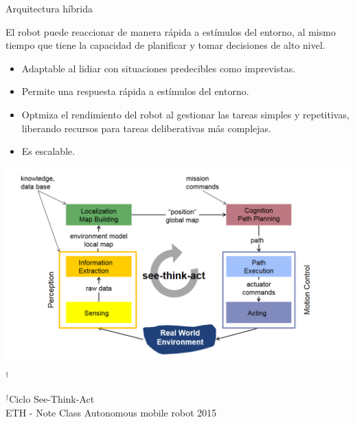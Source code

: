 \documentclass[
  24pt, %
  aspectratio=169, %
]{beamer}
\begin{document}
\begin{frame}{Arquitectura híbrida}
  \begin{minipage}{0.47\textwidth}
    
    \small El robot puede reaccionar de manera rápida a estímulos del entorno, al mismo tiempo que tiene la capacidad de planificar y tomar decisiones de alto nivel.
    
    \begin{itemize}
    \item Adaptable al lidiar con situaciones predecibles como imprevistas.
    \item Permite una respuesta rápida a estímulos del entorno.
    \item Optmiza el rendimiento del robot al gestionar las tareas simples y repetitivas, liberando recursos para tareas deliberativas más complejas.
    \item Es escalable.
    \end{itemize}
  \end{minipage}
  \hspace{0.2cm}
  \begin{minipage}{0.5\textwidth}
    \includegraphics[width=\textwidth]{control-scheme}$^\dag$\\
    \rule{0in}{1.2em}$^\dag$\scriptsize Ciclo See-Think-Act \\
    \tiny ETH - Note Class Autonomous mobile robot 2015 
  \end{minipage}
\end{frame}
\end{document}
